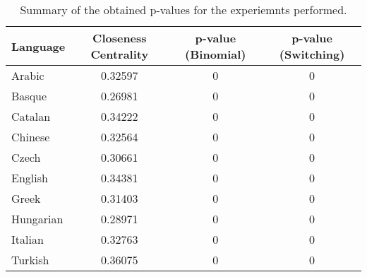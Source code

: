 \begin{table}[!htb]
    \centering
    \begin{tabular}{l c c c} \toprule
        \textbf{Language} & \textbf{Closeness Centrality} & \textbf{p-value (Binomial)} & \textbf{p-value (Switching)} \\ \midrule
Arabic & 0.32597 & 0 & 0 \\ 
Basque & 0.26981 & 0 & 0 \\ 
Catalan & 0.34222 & 0 & 0 \\ 
Chinese & 0.32564 & 0 & 0 \\ 
Czech & 0.30661 & 0 & 0 \\ 
English & 0.34381 & 0 & 0 \\ 
Greek & 0.31403 & 0 & 0 \\ 
Hungarian & 0.28971 & 0 & 0 \\ 
Italian & 0.32763 & 0 & 0 \\ 
Turkish & 0.36075 & 0 & 0 \\  \bottomrule 
    \end{tabular}
    \caption{Summary of the obtained p-values for the experiemnts performed.}
    \label{tab:2}
\end{table}